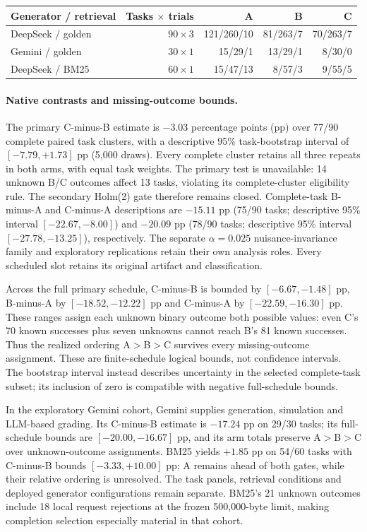 \begin{center}
\small
\setlength{\tabcolsep}{4pt}
\begin{tabular}{@{}lrrrr@{}}
\toprule
Generator / retrieval & Tasks $\times$ trials & A & B & C \\
\midrule
DeepSeek / golden & $90\times3$ & 121/260/10 & 81/263/7 & 70/263/7 \\
Gemini / golden & $30\times1$ & 15/29/1 & 13/29/1 & 8/30/0 \\
DeepSeek / BM25 & $60\times1$ & 15/47/13 & 8/57/3 & 9/55/5 \\
\bottomrule
\end{tabular}
\end{center}

\paragraph{Native contrasts and missing-outcome bounds.}
The primary C-minus-B estimate is $-3.03$ percentage points (pp) over 77/90
complete paired task clusters, with a descriptive 95\% task-bootstrap interval
of $[-7.79,+1.73]$ pp (5,000 draws). Every complete cluster retains all three
repeats in both arms, with equal task weights. The primary test is unavailable:
14 unknown B/C outcomes affect 13 tasks,
violating its complete-cluster eligibility rule. The secondary Holm(2) gate
therefore remains closed. Complete-task B-minus-A and C-minus-A descriptions
are $-15.11$ pp (75/90 tasks; descriptive 95\% interval
$[-22.67,-8.00]$) and $-20.09$ pp (78/90 tasks; descriptive 95\% interval
$[-27.78,-13.25]$), respectively.
The separate $\alpha=0.025$ nuisance-invariance family and exploratory
replications retain their own analysis roles. Every scheduled slot retains
its original artifact and classification.

Across the full primary schedule, C-minus-B is bounded by
$[-6.67,-1.48]$ pp, B-minus-A by $[-18.52,-12.22]$ pp and C-minus-A by
$[-22.59,-16.30]$ pp. These ranges assign each unknown binary outcome both
possible values: even C's 70 known successes plus seven unknowns cannot reach
B's 81 known successes. Thus the realized ordering A$>$B$>$C survives every
missing-outcome assignment. These are finite-schedule logical bounds, not
confidence intervals. The bootstrap interval instead describes uncertainty
in the selected complete-task subset; its inclusion of zero is compatible
with negative full-schedule bounds.

In the exploratory Gemini cohort, Gemini supplies generation, simulation and
LLM-based grading. Its C-minus-B estimate is $-17.24$ pp on 29/30 tasks;
its full-schedule bounds are $[-20.00,-16.67]$ pp, and its arm totals preserve
A$>$B$>$C over unknown-outcome assignments.
BM25 yields $+1.85$ pp on 54/60 tasks with C-minus-B bounds
$[-3.33,+10.00]$ pp; A remains ahead of both gates, while their relative
ordering is unresolved. The task panels, retrieval conditions and deployed
generator configurations remain separate. BM25's 21 unknown outcomes include
18 local request rejections at the frozen 500,000-byte limit, making
completion selection especially material in that cohort.

